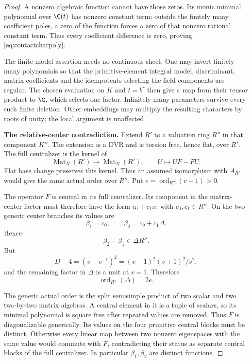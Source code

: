 \begin{proof}
A nonzero algebraic function cannot have those zeros.
Its monic minimal polynomial over $\C(t)$ has nonzero
constant term; outside the finitely many coefficient
poles, a zero of the function forces a zero of that
nonzero rational constant term.
Thus every coefficient difference is zero, proving
\eqref{eq:contactcharpoly}.

The finite-model assertion needs no continuous sheet.
One may invert finitely many polynomials so that the
primitive-element integral model, discriminant, matrix
coefficients and the idempotents selecting the field
components are regular. The chosen evaluation on $K$
and $t=b^r$ then give a map from their tensor product
to $\C$, which selects one factor. Infinitely many
parameters survive every such finite deletion.
Other embeddings may multiply the resulting characters
by roots of unity; the local argument is unaffected.

\par\smallskip\noindent\textbf{The relative-center contradiction.}\quad
Extend $R'$ to a valuation ring $R''$ in that component
$K''$. The extension is a DVR and is torsion free,
hence flat, over $R'$.
The full centralizer is the kernel of
\[
 \operatorname{Mat}_N(R')\longrightarrow
 \operatorname{Mat}_N(R'),\qquad U\longmapsto UF-FU.
\]
Flat base change preserves this kernel.
Thus an assumed isomorphism with $A_{R'}$ would give
the same actual order over $R''$.
Put $e=\operatorname{ord}_{R''}(v-1)>0$.

The operator $F$ is central in its full centralizer.
Its component in the matrix-center factor must
therefore have the form $c_0+c_1x$, with
$c_0,c_1\in R''$.
On the two generic center branches its values are
\[
 \beta_1=c_0,\qquad
 \beta_2=c_0+c_1\Delta.
\]
Hence
\begin{equation}\label{eq:contactdivisibility}
 \beta_2-\beta_1\in\Delta R''.
\end{equation}
But
\[
 D-4=(v-v^{-1})^2
     =(v-1)^2(v+1)^2/v^2,
\]
and the remaining factor in $\Delta$ is a unit at
$v=1$. Therefore
\[
 \operatorname{ord}_{R''}(\Delta)=2e.
\]

The generic actual order is the split semisimple
product of two scalar and two two-by-two matrix
algebras. A central element in it is a tuple of
scalars, so its minimal polynomial is square free
after repeated values are removed. Thus $F$ is
diagonalizable generically.
Its values on the four primitive central blocks
must be distinct. Otherwise every linear map between
two nonzero eigenspaces with the same value would
commute with $F$, contradicting their status as
separate central blocks of the full centralizer.
In particular $\beta_1,\beta_2$ are distinct functions.


\end{proof}
